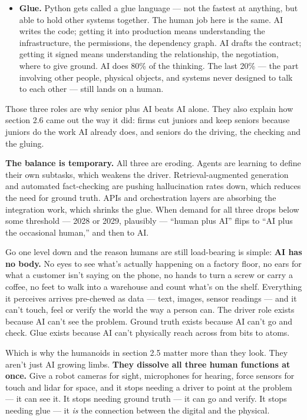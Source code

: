 \documentclass[11pt,a4paper]{article}
\begin{document}
\begin{itemize}
  \item \textbf{Glue.} Python gets called a glue language --- not the fastest at anything, but able to hold other systems together. The human job here is the same. AI writes the code; getting it into production means understanding the infrastructure, the permissions, the dependency graph. AI drafts the contract; getting it signed means understanding the relationship, the negotiation, where to give ground. AI does 80\% of the thinking. The last 20\% --- the part involving other people, physical objects, and systems never designed to talk to each other --- still lands on a human.
\end{itemize}

Those three roles are why senior plus AI beats AI alone. They also explain how section 2.6 came out the way it did: firms cut juniors and keep seniors because juniors do the work AI already does, and seniors do the driving, the checking and the gluing.

\textbf{The balance is temporary.} All three are eroding. Agents are learning to define their own subtasks, which weakens the driver. Retrieval-augmented generation and automated fact-checking are pushing hallucination rates down, which reduces the need for ground truth. APIs and orchestration layers are absorbing the integration work, which shrinks the glue. When demand for all three drops below some threshold --- 2028 or 2029, plausibly --- ``human plus AI'' flips to ``AI plus the occasional human,'' and then to AI.

Go one level down and the reason humans are still load-bearing is simple: \textbf{AI has no body.} No eyes to see what's actually happening on a factory floor, no ears for what a customer isn't saying on the phone, no hands to turn a screw or carry a coffee, no feet to walk into a warehouse and count what's on the shelf. Everything it perceives arrives pre-chewed as data --- text, images, sensor readings --- and it can't touch, feel or verify the world the way a person can. The driver role exists because AI can't see the problem. Ground truth exists because AI can't go and check. Glue exists because AI can't physically reach across from bits to atoms.

Which is why the humanoids in section 2.5 matter more than they look. They aren't just AI growing limbs. \textbf{They dissolve all three human functions at once.} Give a robot cameras for sight, microphones for hearing, force sensors for touch and lidar for space, and it stops needing a driver to point at the problem --- it can see it. It stops needing ground truth --- it can go and verify. It stops needing glue --- it \textit{is} the connection between the digital and the physical.
\end{document}
